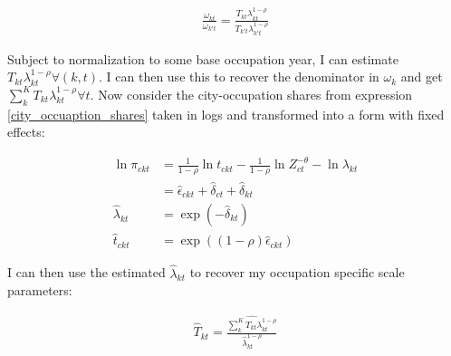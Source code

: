 \documentclass[10pt]{article}
\begin{document}
\begin{align*}
    \frac{\omega_{kt}}{\omega_{k't}} = \frac{T_{kt} \lambda_{kt}^{1 - \rho}}{T_{k't} \lambda_{k't}^{1 - \rho}}
\end{align*}

Subject to normalization to some base occupation year, I can estimate $T_{kt} \lambda_{kt}^{1 - \rho} \forall (k, t)$. I can then use this to recover the denominator in $\omega_k$ and get $\sum_{k}^{K} T_{kt} \lambda_{kt}^{1 - \rho} \forall t$. Now consider the city-occupation shares from expression \ref{city_occuaption_shares} taken in logs and transformed into a form with fixed effects:

\begin{align*}
    \ln \pi_{ckt}      & = \frac{1}{1 - \rho} \ln t_{ckt} - \frac{1}{1 - \rho} \ln Z_{ct}^{- \theta} - \ln \lambda_{kt} \\
                       & = \hat{\epsilon}_{ckt} + \hat{\delta}_{ct} + \hat{\delta}_{kt}                                 \\
    \hat{\lambda}_{kt} & = \exp \left( - \hat{\delta}_{kt} \right)                                                      \\
    \hat{t}_{ckt}      & = \exp \left( (1 - \rho) \hat{\epsilon}_{ckt} \right)
\end{align*}



I can then use the estimated $\hat{\lambda}_{kt}$ to recover my occupation specific scale parameters:

\begin{align*}
    \hat{T}_{kt} = \frac{\widehat{\sum_{k}^{K} T_{kt} \lambda_{kt}^{1 - \rho}}}{\hat{\lambda}_{kt}^{1 - \rho}}
\end{align*}


\end{document}
